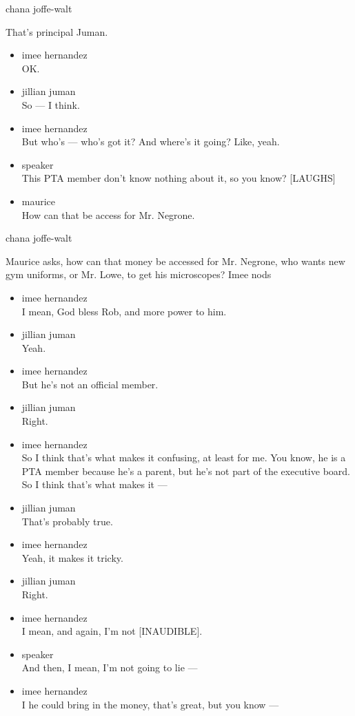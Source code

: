 chana joffe-walt

That's principal Juman.

\begin{itemize}
\item
  imee hernandez\\
  OK.
\item
  jillian juman\\
  So --- I think.
\item
  imee hernandez\\
  But who's --- who's got it? And where's it going? Like, yeah.
\item
  speaker\\
  This PTA member don't know nothing about it, so you know? {[}LAUGHS{]}
\item
  maurice\\
  How can that be access for Mr. Negrone.
\end{itemize}

chana joffe-walt

Maurice asks, how can that money be accessed for Mr. Negrone, who wants
new gym uniforms, or Mr. Lowe, to get his microscopes? Imee nods

\begin{itemize}
\item
  imee hernandez\\
  I mean, God bless Rob, and more power to him.
\item
  jillian juman\\
  Yeah.
\item
  imee hernandez\\
  But he's not an official member.
\item
  jillian juman\\
  Right.
\item
  imee hernandez\\
  So I think that's what makes it confusing, at least for me. You know,
  he is a PTA member because he's a parent, but he's not part of the
  executive board. So I think that's what makes it ---
\item
  jillian juman\\
  That's probably true.
\item
  imee hernandez\\
  Yeah, it makes it tricky.
\item
  jillian juman\\
  Right.
\item
  imee hernandez\\
  I mean, and again, I'm not {[}INAUDIBLE{]}.
\item
  speaker\\
  And then, I mean, I'm not going to lie ---
\item
  imee hernandez\\
  I he could bring in the money, that's great, but you know ---
\end{itemize}

